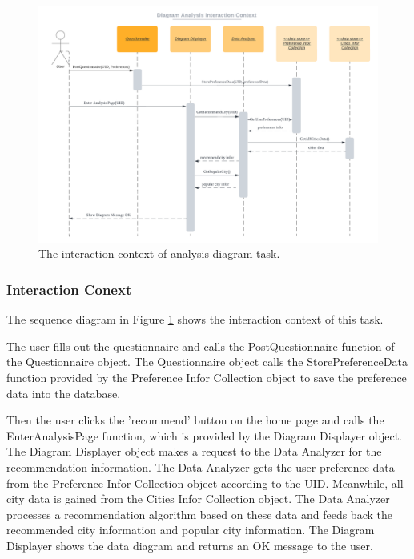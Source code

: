 \documentclass[conference]{IEEEtran}
\begin{document}
\begin{figure}[htbp]
\centerline{\includegraphics[width=1.0\textwidth]{diagram_interaction_context.pdf}}
\caption{The interaction context of analysis diagram task.}
\label{diagram_interaction}
\end{figure}

\subsubsection{\textbf{Interaction Conext }}

\textbf{}

The sequence diagram in Figure \ref{diagram_interaction} shows the interaction context of this task. 

The user fills out the questionnaire and calls the PostQuestionnaire function of the Questionnaire object. The Questionnaire object calls the StorePreferenceData function provided by the Preference Infor Collection object to save the preference data into the database. 

Then the user clicks the 'recommend' button on the home page and calls the EnterAnalysisPage function, which is provided by the Diagram Displayer object. The Diagram Displayer object makes a request to the Data Analyzer for the recommendation information. The Data Analyzer gets the user preference data from the Preference Infor Collection object according to the UID. Meanwhile, all city data is gained from the Cities Infor Collection object. The Data Analyzer processes a recommendation algorithm based on these data and feeds back the recommended city information and popular city information. The Diagram Displayer shows the data diagram and returns an OK message to the user.
\end{document}

